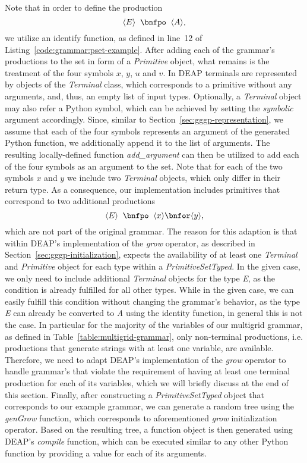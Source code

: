 Note that in order to define the production
\begin{equation*}
	\ps E \; \; \bnfpo \; \; \ps A,
\end{equation*}
we utilize an identify function, as defined in line~12 of Listing~\ref{code:grammar:pset-example}.
After adding each of the grammar's productions to the set in form of a \emph{Primitive} object, what remains is the treatment of the four symbols $x$, $y$, $u$ and $v$.
In DEAP terminals are represented by objects of the \emph{Terminal} class, which corresponds to a primitive without any arguments, and, thus, an empty list of input types.
Optionally, a \emph{Terminal} object may also refer a Python symbol, which can be achieved by setting the \emph{symbolic} argument accordingly.
Since, similar to Section~\ref{sec:gggp-representation}, we assume that each of the four symbols represents an argument of the generated Python function, we additionally append it to the list of arguments.
The resulting locally-defined function \emph{add\_argument} can then be utilized to add each of the four symbols as an argument to the set. 
Note that for each of the two symbols $x$ and $y$ we include two \emph{Terminal} objects, which only differ in their return type.
As a consequence, our implementation includes primitives that correspond to two additional productions
\begin{equation*}
	\ps E \; \; \bnfpo \; \; \ps x \bnfor \ps y,
\end{equation*}
which are not part of the original grammar.
The reason for this adaption is that within DEAP's implementation of the \emph{grow} operator, as described in Section~\ref{sec:gggp-initialization}, expects the availability of at least one \emph{Terminal} and \emph{Primitive} object for each type within a \emph{PrimitiveSetTyped}.
In the given case, we only need to include additional \emph{Terminal} objects for the type \emph{E}, as the condition is already fulfilled for all other types.
While in the given case, we can easily fulfill this condition without changing the grammar's behavior, as the type \emph{E} can already be converted to \emph{A} using the identity function, in general this is not the case.
In particular for the majority of the variables of our multigrid grammar, as defined in Table~\ref{table:multigrid-grammar}, only non-terminal productions, i.e. productions that generate strings with at least one variable, are available.
Therefore, we need to adapt DEAP's implementation of the \emph{grow} operator to handle grammar's that violate the requirement of having at least one terminal production for each of its variables, which we will briefly discuss at the end of this section.
Finally, after constructing a \emph{PrimitiveSetTyped} object that corresponds to our example grammar, we can generate a random tree using the \emph{genGrow} function, which corresponds to aforementioned \emph{grow} initialization operator.
Based on the resulting tree, a function object is then generated using DEAP's \emph{compile} function, which can be executed similar to any other Python function by providing a value for each of its arguments.

